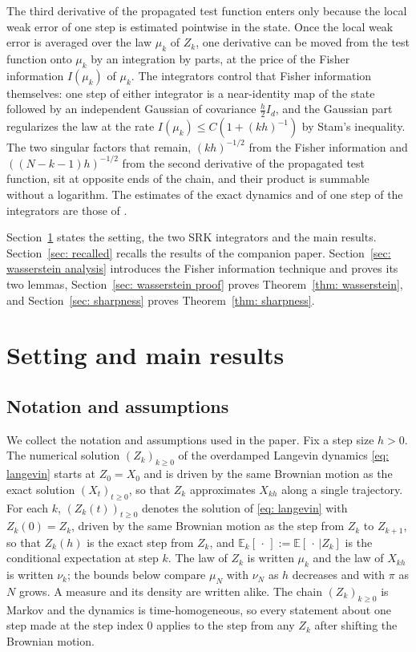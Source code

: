 \documentclass[namedate,webpdf,imanum]{ima-authoring-template}
\newcommand{\Le}{\leqslant}
\newcommand{\Ge}{\geqslant}
\theoremstyle{thmstyletwo}
\newcommand{\yw}[1]{\todo[inline,color=blue!35]{YW: #1}}
\numberwithin{equation}{section}
\begin{document}
The third derivative of the propagated test function enters only because the local weak error of one step is estimated pointwise in the state. Once the local weak error is averaged over the law $\mu_k$ of $Z_k$, one derivative can be moved from the test function onto $\mu_k$ by an integration by parts, at the price of the Fisher information $I(\mu_k)$ of $\mu_k$. The integrators control that Fisher information themselves: one step of either integrator is a near-identity map of the state followed by an independent Gaussian of covariance $\frac h2 I_d$, and the Gaussian part regularizes the law at the rate $I(\mu_k) \Le C (1 + (kh)^{-1})$ by Stam's inequality. The two singular factors that remain, $(kh)^{-1/2}$ from the Fisher information and $((N-k-1)h)^{-1/2}$ from the second derivative of the propagated test function, sit at opposite ends of the chain, and their product is summable without a logarithm. The estimates of the exact dynamics and of one step of the integrators are those of \citet{ye2026mse}.

Section~\ref{sec: framework} states the setting, the two SRK integrators and the main results. Section~\ref{sec: recalled} recalls the results of the companion paper. Section~\ref{sec: wasserstein analysis} introduces the Fisher information technique and proves its two lemmas, Section~\ref{sec: wasserstein proof} proves Theorem~\ref{thm: wasserstein}, and Section~\ref{sec: sharpness} proves Theorem~\ref{thm: sharpness}.

\section{Setting and main results}
\label{sec: framework}

\subsection{Notation and assumptions}
\label{subsec: notation}

We collect the notation and assumptions used in the paper. Fix a step size $h > 0$. The numerical solution $(Z_k)_{k \Ge 0}$ of the overdamped Langevin dynamics \eqref{eq: langevin} starts at $Z_0 = X_0$ and is driven by the same Brownian motion as the exact solution $(X_t)_{t \Ge 0}$, so that $Z_k$ approximates $X_{kh}$ along a single trajectory. For each $k$, $(Z_k(t))_{t \Ge 0}$ denotes the solution of \eqref{eq: langevin} with $Z_k(0) = Z_k$, driven by the same Brownian motion as the step from $Z_k$ to $Z_{k+1}$, so that $Z_k(h)$ is the exact step from $Z_k$, and $\mathbb E_k[\,\cdot\,] := \mathbb E[\,\cdot\,|Z_k]$ is the conditional expectation at step $k$. The law of $Z_k$ is written $\mu_k$ and the law of $X_{kh}$ is written $\nu_k$; the bounds below compare $\mu_N$ with $\nu_N$ as $h$ decreases and with $\pi$ as $N$ grows. A measure and its density are written alike. The chain $(Z_k)_{k\Ge0}$ is Markov and the dynamics is time-homogeneous, so every statement about one step made at the step index $0$ applies to the step from any $Z_k$ after shifting the Brownian motion.
\end{document}

